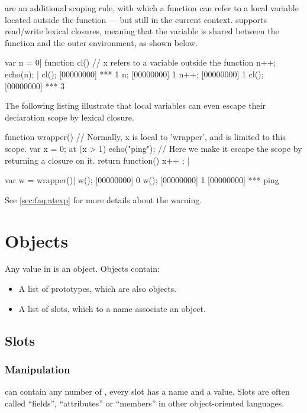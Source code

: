  are an additional scoping rule, with which a function
can refer to a local variable located outside the function --- but still
in the current context. \us supports read/write lexical closures,
meaning that the variable is shared between the function and the outer
environment, as shown below.

\begin{urbiscript}[firstnumber=last]
var n = 0|
function cl()
{
  // x refers to a variable outside the function
  n++;
  echo(n);
}|
cl();
[00000000] *** 1
n;
[00000000] 1
n++;
[00000000] 1
cl();
[00000000] *** 3
\end{urbiscript}

The following listing illustrate that local variables can even
escape their declaration scope by lexical closure.

\begin{urbiscript}[firstnumber=last]
function wrapper()
{
  // Normally, x is local to 'wrapper', and is limited to this scope.
  var x = 0;
  at (x > 1)
    echo("ping");
  // Here we make it escape the scope by returning a closure on it.
  return function() { x++ };
} |

var w = wrapper()|
w();
[00000000] 0
w();
[00000000] 1
[00000000] *** ping
\end{urbiscript}

See \autoref{sec:faq:atexp} for more details about the warning.


\section{Objects}

Any value in \us is an object. Objects contain:

\begin{itemize}
\item A list of prototypes, which are also objects.
\item A list of slots, which to a name associate an object.
\end{itemize}

\subsection{Slots}

\subsubsection{Manipulation}

 can contain any number of , every slot has a
name and a value. Slots are often called ``fields'', ``attributes'' or
``members'' in other object-oriented languages.

